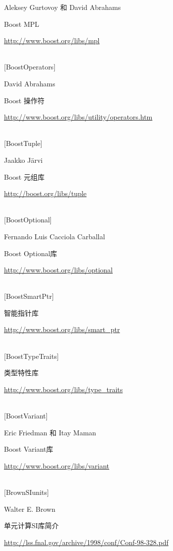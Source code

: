 Aleksey Gurtovoy 和 David Abrahams

Boost MPL

\url{http://www.boost.org/libs/mpl}

\hspace*{\fill} \\ %
{[BoostOperators]}

David Abrahams

Boost 操作符

\url{http://www.boost.org/libs/utility/operators.htm}

\hspace*{\fill} \\ %
{[BoostTuple]}

Jaakko J{\"a}rvi

Boost 元组库

\url{http://boost.org/libs/tuple}

\hspace*{\fill} \\ %
{[BoostOptional]}

Fernando Luis Cacciola Carballal

Boost Optional库

\url{http://www.boost.org/libs/optional}

\hspace*{\fill} \\ %
{[BoostSmartPtr]}

智能指针库

\url{http://www.boost.org/libs/smart_ptr}

\hspace*{\fill} \\ %
{[BoostTypeTraits]}

类型特性库

\url{http://www.boost.org/libs/type_traits}

\hspace*{\fill} \\ %
{[BoostVariant]}

Eric Friedman 和 Itay Maman

Boost Variant库

\url{http://www.boost.org/libs/variant}

\hspace*{\fill} \\ %
{[BrownSIunits]}

Walter E. Brown

单元计算SI库简介

\url{http://lss.fnal.gov/archive/1998/conf/Conf-98-328.pdf}

